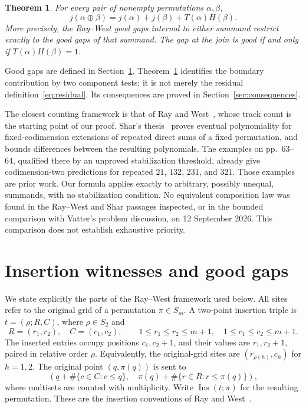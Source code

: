 \documentclass[11pt,a4paper]{article}
\newtheorem{theorem}{Theorem}[section]
\theoremstyle{remark}
\newcommand{\Ins}{\operatorname{Ins}}
\begin{document}
\begin{theorem}\label{thm:sum}
For every pair of nonempty permutations $\alpha,\beta$,
\begin{equation}\label{eq:sum}
 j(\alpha\oplus\beta)=j(\alpha)+j(\beta)+T(\alpha)H(\beta).
\end{equation}
More precisely, the Ray--West good gaps internal to either summand
restrict exactly to the good gaps of that summand. The gap at the join
is good if and only if $T(\alpha)H(\beta)=1$.
\end{theorem}

Good gaps are defined in Section~\ref{sec:tracks}. Theorem~\ref{thm:sum}
identifies the boundary contribution by two component tests; it is not
merely the residual definition~\eqref{eq:residual}. Its consequences are
proved in Section~\ref{sec:consequences}.

The closest counting framework is that of Ray and West~\cite{raywest},
whose track count is the starting point of our proof. Shar's
thesis~\cite[Corollary~4.21 and Theorem~4.25]{shar} proves eventual
polynomiality for fixed-codimension extensions of repeated direct sums
of a fixed permutation, and bounds differences between the resulting
polynomials. The examples on pp.~63--64, qualified there by an unproved
stabilization threshold, already give codimension-two predictions for
repeated $21$, $132$, $231$, and $321$. Those examples are prior work.
Our formula applies exactly to arbitrary, possibly unequal, summands,
with no stabilization condition. No equivalent composition law was found
in the Ray--West and Shar passages inspected, or in the bounded comparison
with Vatter's problem discussion, on 12 September 2026. This comparison
does not establish exhaustive priority.

\section{Insertion witnesses and good gaps}\label{sec:tracks}

We state explicitly the parts of the Ray--West framework used below.
All sites refer to the original grid of a permutation $\pi\in S_m$.
A two-point insertion triple is $t=(\rho;R,C)$, where
$\rho\in S_2$ and
\[
 R=(r_1,r_2),\quad C=(c_1,c_2),\qquad
 1\le r_1\le r_2\le m+1,\quad 1\le c_1\le c_2\le m+1.
\]
The inserted entries occupy positions $c_1,c_2+1$, and their values
are $r_1,r_2+1$, paired in relative order $\rho$. Equivalently, the
original-grid sites are $(r_{\rho(h)},c_h)$ for $h=1,2$.
The original point $(q,\pi(q))$ is sent to
\begin{equation}\label{eq:shift}
 \left(q+\#\{c\in C:c\le q\},\quad
 \pi(q)+\#\{r\in R:r\le\pi(q)\}\right),
\end{equation}
where multisets are counted with multiplicity. Write $\Ins(t;\pi)$
for the resulting permutation. These are the insertion conventions of
Ray and West~\cite[Section~4]{raywest}.
\end{document}
